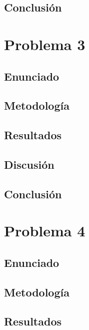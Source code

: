 \documentclass{article}
\begin{document}
\subsection{Conclusión}

\section{Problema 3}

\subsection{Enunciado}

\subsection{Metodología}

\subsection{Resultados}
\setcounter{equation}{0}

\subsection{Discusión}

\subsection{Conclusión}

\section{Problema 4}

\subsection{Enunciado}

\subsection{Metodología}

\subsection{Resultados}
\setcounter{equation}{0}
\end{document}
